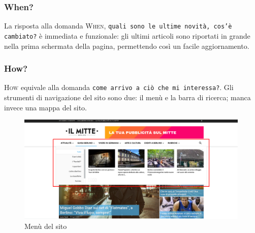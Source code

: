\subsubsection{When?}
La risposta alla domanda \textsc{When}, \texttt{quali sono le ultime novità, cos'è cambiato?} è immediata e funzionale: gli ultimi articoli sono riportati in grande nella prima schermata della pagina, permettendo così un facile aggiornamento.

\subsubsection{How?}
\textsc{How} equivale alla domanda \texttt{come arrivo a ciò che mi interessa?}. Gli strumenti di navigazione del sito sono due: il menù e la barra di ricerca; manca invece una mappa del sito.

\vspace{30pt}
\begin{figure}[htbp]
\begin{center}
\includegraphics[width=30em]{img/menu}
\caption{Menù del sito}
\end{center}
\end{figure}
\vspace{30pt}

